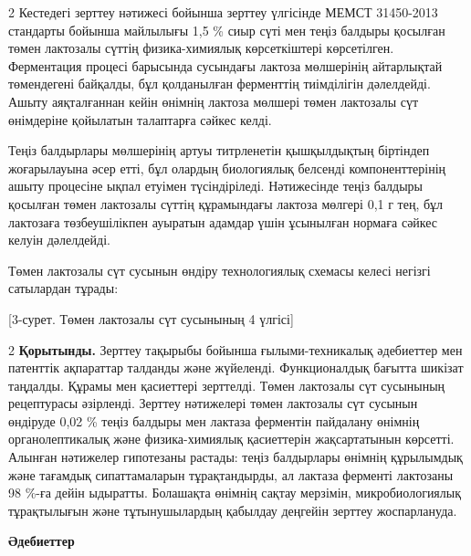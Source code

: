 \begin{multicols}{2}
Кестедегі зерттеу нәтижесі бойынша зерттеу үлгісінде МЕМСТ 31450-2013
стандарты бойынша майлылығы 1,5 \% сиыр сүті мен теңіз балдыры қосылған
төмен лактозалы сүттің физика-химиялық көрсеткіштері көрсетілген.
Ферментация процесі барысында сусындағы лактоза мөлшерінің айтарлықтай
төмендегені байқалды, бұл қолданылған ферменттің тиімділігін дәлелдейді.
Ашыту аяқталғаннан кейін өнімнің лактоза мөлшері төмен лактозалы сүт
өнімдеріне қойылатын талаптарға сәйкес келді.

Теңіз балдырлары мөлшерінің артуы титрленетін қышқылдықтың біртіндеп
жоғарылауына әсер етті, бұл олардың биологиялық белсенді
компоненттерінің ашыту процесіне ықпал етуімен түсіндіріледі.
Нәтижесінде теңіз балдыры қосылған төмен лактозалы сүттің құрамындағы
лактоза мөлгері 0,1 г тең, бұл лактозаға төзбеушілікпен ауыратын адамдар
үшін ұсынылған нормаға сәйкес келуін дәлелдейді.

Төмен лактозалы сүт сусынын өндіру технологиялық схемасы келесі негізгі
сатылардан тұрады:
\end{multicols}

[3-сурет. Төмен лактозалы сүт сусынының
4 үлгісі]

\begin{multicols}{2}
{\bfseries Қорытынды.} Зерттеу тақырыбы бойынша ғылыми-техникалық
әдебиеттер мен патенттік ақпараттар талданды және жүйеленді.
Функционалдық бағытта шикізат таңдалды. Құрамы мен қасиеттері зерттелді.
Төмен лактозалы сүт сусынының рецептурасы әзірленді. Зерттеу нәтижелері
төмен лактозалы сүт сусынын өндіруде 0,02 \% теңіз балдыры мен лактаза
ферментін пайдалану өнімнің органолептикалық және физика-химиялық
қасиеттерін жақсартатынын көрсетті. Алынған нәтижелер гипотезаны
растады: теңіз балдырлары өнімнің құрылымдық және тағамдық
сипаттамаларын тұрақтандырды, ал лактаза ферменті лактозаны 98 \%-ға
дейін ыдыратты. Болашақта өнімнің сақтау мерзімін, микробиологиялық
тұрақтылығын және тұтынушылардың қабылдау деңгейін зерттеу жоспарлануда.
\end{multicols}

\begin{center}
{\bfseries Әдебиеттер}
\end{center}

